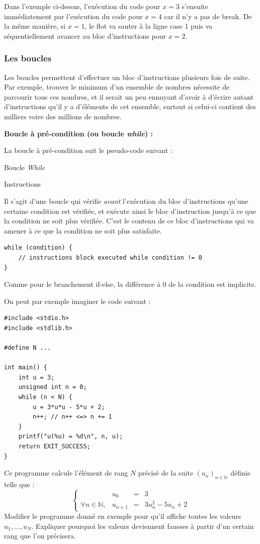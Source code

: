 \documentclass[../../../main.tex]{subfiles}
\begin{document}
Dans l'exemple ci-dessus, l'exécution du code pour $x = 3$ s'ensuite immédiatement par l'exécution du code pour $x = 4$ car il n'y a pas de \textsf{break}. De la même manière, si $x = 1$, le flot va sauter à la ligne \textsf{case 1} puis va séquentiellement avancer au bloc d'instructions pour $x = 2$.
\subsubsection{Les boucles}
\vspace*{2mm}
Les boucles permettent d'effectuer un bloc d'instructions plusieurs fois de suite. Par exemple, trouver le minimum d'un ensemble de nombres nécessite de parcourir tous ces nombres, et il serait un peu ennuyant d'avoir à d'écrire autant d'instructions qu'il y a d'éléments de cet ensemble, surtout si celui-ci contient des milliers voire des millions de nombres.
 
\textbf{Boucle à pré-condition (ou boucle \textit{while}) :}
 
La boucle à pré-condition suit le pseudo-code suivant :
\begin{algorithm}
\caption{Boucle \textit{While}}
 {
	Instructions
}
\end{algorithm}
\newline
Il s'agit d'une boucle qui vérifie \textit{avant} l'exécution du bloc d'instructions qu'une certaine condition est vérifiée, et exécute ainsi le bloc d'instruction jusqu'à ce que la condition ne soit plus vérifiée. C'est le contenu de ce bloc d'instructions qui va amener à ce que la condition ne soit plus satisfaite.
\begin{verbatim}
while (condition) {
	// instructions block executed while condition != 0
}
\end{verbatim}
Comme pour le branchement \textsf{if-else}, la différence à 0 de la condition est implicite.
 
On peut par exemple imaginer le code suivant :
\begin{verbatim}
#include <stdio.h>
#include <stdlib.h>

#define N ...

int main() {
	int u = 3;
	unsigned int n = 0;
	while (n < N) {
		u = 3*u*u - 5*u + 2;
		n++; // n++ <=> n += 1
	}
	printf("u(%u) = %d\n", n, u);
	return EXIT_SUCCESS;
}
\end{verbatim}
Ce programme calcule l'élément de rang $N$ précisé de la suite $(u_{n})_{n\in{\mathbb{N}}}$ définie telle que :
$$
\left\{\begin{array}{llcl}
& u_{0} & = & 3 \\
\forall{n\in{\mathbb{N}}}, & u_{n+1} & = & 3u_{n}^{2} - 5u_{n} + 2
\end{array}\right.
$$
\exercise{[COURS]} Modifier le programme donné en exemple pour qu'il affiche toutes les valeurs $u_{1}, \dots, u_{N}$. \newline
Expliquer pourquoi les valeurs deviennent fausses à partir d'un certain rang que l'on précisera.
 
\end{document}
